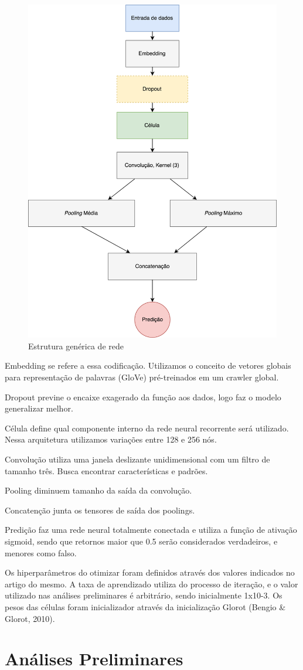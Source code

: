 \documentclass[12pt]{article}
\begin{document}
\begin{figure}[ht]
\centering
\includegraphics[width=.5\textwidth]{images/graph.png}
\caption{Estrutura genérica de rede}
\label{fig:graph}
\end{figure}

Embedding se refere a essa codificação. Utilizamos o conceito de vetores globais para representação de palavras (GloVe) pré-treinados em um crawler global.

Dropout previne o encaixe exagerado da função aos dados, logo faz o modelo generalizar melhor.

Célula define qual componente interno da rede neural recorrente será utilizado. Nessa arquitetura utilizamos variações entre 128 e 256 nós.

Convolução utiliza uma janela deslizante unidimensional com um filtro de tamanho três. Busca encontrar características e padrões.

Pooling diminuem tamanho da saída da convolução.

Concatenção junta os tensores de saída dos poolings.

Predição faz uma rede neural totalmente conectada e utiliza a função de ativação sigmoid, sendo que retornos maior que 0.5 serão considerados verdadeiros, e menores como falso.

Os hiperparâmetros do otimizar foram definidos através dos valores indicados no artigo do mesmo. A taxa de aprendizado utiliza do processo de iteração, e o valor utilizado nas análises preliminares é arbitrário, sendo inicialmente 1x10-3. Os pesos das células foram inicializador através da inicialização Glorot (Bengio & Glorot, 2010).

\section{Análises Preliminares}
\end{document}
